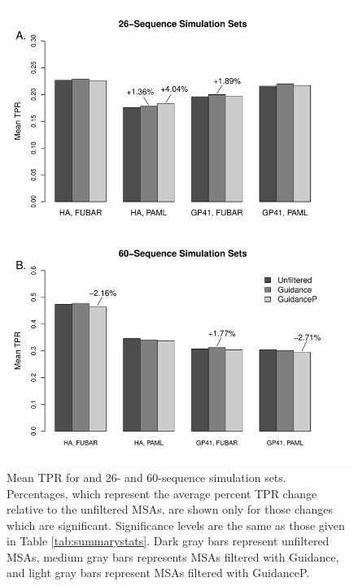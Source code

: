 \documentclass[11pt]{article}
\begin{document}
\begin{figure}[H]
\centerline{\includegraphics[width=4.75in]{Figures/barplot.pdf}}
\caption{\label{barplot} Mean TPR for and 26- and  60-sequence simulation sets. Percentages, which represent the average percent TPR change relative to the unfiltered MSAs, are shown only for those changes which are significant. Significance levels are the same as those given in Table \ref{tab:summarystats}. Dark gray bars represent unfiltered MSAs, medium gray bars represents MSAs filtered with Guidance, and light gray bars represent MSAs filtered with GuidanceP.}
\end{figure}

\bigskip
\end{document}
